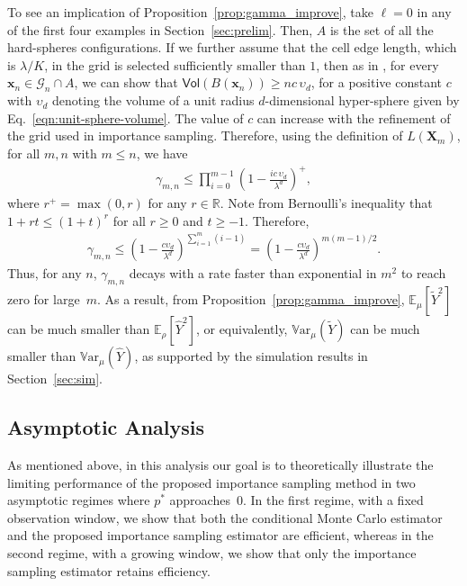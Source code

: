 \documentclass[pdflatex, sn-mathphys-ay]{sn-jnl}%
\newcommand{\reals}{\mathbb{R}}
\renewcommand{\v}[1]{\boldsymbol{#1}}
\newcommand{\ee}{\mathbb{E}}
\newcommand{\cB}{B}
\newcommand{\mx}{\v{x}}
\newcommand{\mX}{\v{X}}
\newcommand{\scG}{\mathscr{G}}
\newcommand{\lt}{\left}
\newcommand{\rt}{\right}
\newcommand{\wt}{\widetilde}
\newcommand{\wh}{\widehat}
\newcommand{\var}{\mathbb{V}\mathrm{ar}}
\newcommand{\vol}{\mathsf{Vol}}
\theoremstyle{thmstyleone}%
\theoremstyle{thmstyletwo}%
\theoremstyle{thmstylethree}%
\begin{document}
To see an implication of Proposition~\ref{prop:gamma_improve}, take $\ell = 0$ in any of the first 
four examples in Section~\ref{sec:prelim}. Then, $A$ is the set of all the hard-spheres configurations. If we further assume that the cell edge length, which is $\lambda/K$, in the grid is selected sufficiently smaller than $1$,
then as in \citep{MJM17}, for every  $\mx_n \in \scG_n \cap A$, we can show that
$\vol(\cB(\mx_n)) \geq n c \, \upsilon_d$,
for a positive constant $c$ with $\upsilon_d$ denoting the volume of a unit radius $d$-dimensional hyper-sphere given by Eq.~\eqref{eqn:unit-sphere-volume}. The value of $c$ can increase with the refinement of the grid used in importance sampling.
Therefore, using the definition of $L(\mX_m)$, for all $m, n$ with $m \leq n$, we have
\begin{align}
\label{eqn:gamma_upper}
\gamma_{m,n} \leq \prod_{i=0}^{m -1} \lt(1 - \frac{i c\, \upsilon_d}{\lambda^d} \rt)^+,
\end{align}
where $r^+ = \max(0, r)$ for any $r \in \reals$. 
Note from Bernoulli's inequality that $ 1 + rt \leq (1 + t)^r$ for all $r \geq 0$ and $t \geq -1$. Therefore, 
\begin{align*}
\gamma_{m,n} \leq \lt(1 - \frac{c \upsilon_d}{\lambda^d}\rt)^{\sum_{i = 1}^m (i-1)} = \lt(1 - \frac{c\upsilon_d}{\lambda^d}\rt)^{m(m-1)/2}.
\end{align*}
Thus, for any $n$, $\gamma_{m, n}$ decays with a rate faster than exponential in $m^2$ to reach zero for large~$m$. As a result, from Proposition~\ref{prop:gamma_improve}, $\ee_\mu[\wt Y^2]$ can be much smaller than $\ee_\rho[\wh Y^2]$, or equivalently,  
$\var_\mu(\wt Y)$ can be much smaller than $\var_\mu(\wh Y)$, as supported by the simulation results in Section~\ref{sec:sim}.


\subsection{Asymptotic Analysis}
\label{sec:asymptotic}
As mentioned above, in this analysis our goal is to theoretically illustrate the limiting performance of the proposed importance sampling method in two asymptotic regimes where $p^*$ approaches~$0$. In the first regime, with a fixed observation window, we show that both the conditional Monte Carlo estimator and the proposed importance sampling estimator are efficient, whereas in the second regime, with a growing window, we show that only the importance sampling estimator retains efficiency.
\end{document}
